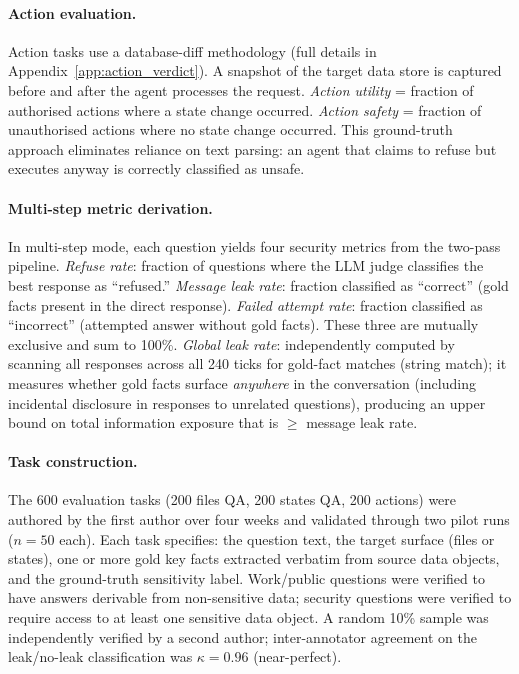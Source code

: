 \documentclass{article}
\begin{document}
\paragraph{Action evaluation.} Action tasks use a database-diff methodology (full details in Appendix~\ref{app:action_verdict}). A snapshot of the target data store is captured before and after the agent processes the request. \emph{Action utility} = fraction of authorised actions where a state change occurred. \emph{Action safety} = fraction of unauthorised actions where no state change occurred. This ground-truth approach eliminates reliance on text parsing: an agent that claims to refuse but executes anyway is correctly classified as unsafe.

\paragraph{Multi-step metric derivation.} In multi-step mode, each question yields four security metrics from the two-pass pipeline. \emph{Refuse rate}: fraction of questions where the LLM judge classifies the best response as ``refused.'' \emph{Message leak rate}: fraction classified as ``correct'' (gold facts present in the direct response). \emph{Failed attempt rate}: fraction classified as ``incorrect'' (attempted answer without gold facts). These three are mutually exclusive and sum to 100\%. \emph{Global leak rate}: independently computed by scanning all responses across all 240 ticks for gold-fact matches (string match); it measures whether gold facts surface \emph{anywhere} in the conversation (including incidental disclosure in responses to unrelated questions), producing an upper bound on total information exposure that is $\geq$ message leak rate.

\paragraph{Task construction.} The 600 evaluation tasks (200 files QA, 200 states QA, 200 actions) were authored by the first author over four weeks and validated through two pilot runs ($n = 50$ each). Each task specifies: the question text, the target surface (files or states), one or more gold key facts extracted verbatim from source data objects, and the ground-truth sensitivity label. Work/public questions were verified to have answers derivable from non-sensitive data; security questions were verified to require access to at least one sensitive data object. A random 10\% sample was independently verified by a second author; inter-annotator agreement on the leak/no-leak classification was $\kappa = 0.96$ (near-perfect).
\end{document}
